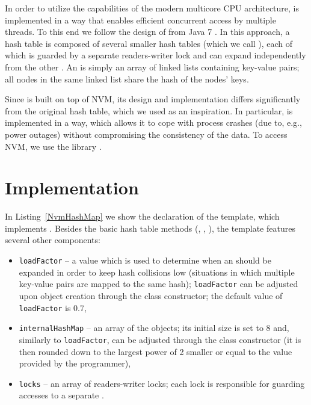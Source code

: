     
    In order to utilize the capabilities of the modern multicore CPU architecture, \PHT is implemented in a way that enables efficient concurrent access by multiple threads. 
    To this end we follow the design of \ConcurrentHashMap from Java 7 \cite{ConcurrentHashMapJava}. 
    In this approach, a hash table is composed of several smaller hash tables (which we call \internalHashMap), each of which is guarded by a separate readers-writer lock and can expand independently from the other \internalHashMaps. 
    An \internalHashMap is simply an array of linked lists containing key-value pairs; all nodes in the same linked list share the hash of the nodes' keys.
    
    Since \PHT is built on top of NVM, its design and implementation differs significantly from the original hash table, which we used as an inspiration. 
    In particular, \PHT is implemented in a way, which allows it to cope with process crashes (due to, e.g., power outages) without compromising the consistency of the data. 
    To access NVM, we use the \libpmemobj library \cite{Libpmemobj}.
    
\section{Implementation}

    In Listing~\ref{NvmHashMap} we show the declaration of the \NvmHashMap template, which implements \PHT. Besides the basic hash table methods (\getMethod, \insertMethod, \removeMethod), the template features several other components:
    \begin{itemize}
        \item \texttt{loadFactor} -- a value which is used to determine when an \internalHashMap should be expanded in order to keep hash collisions low (situations in which multiple key-value pairs are mapped to the same hash); \texttt{loadFactor} can be adjusted upon object creation through the class constructor; the default value of \texttt{loadFactor} is 0.7, 
        \item \texttt{internalHashMap} -- an array of the \internalHashMap objects; its initial size is set to 8 and, similarly to \texttt{loadFactor}, can be adjusted through the class constructor (it is then rounded down to the largest power of 2 smaller or equal to the value provided by the programmer),
        \item \texttt{locks} -- an array of readers-writer locks; each lock is responsible for guarding accesses to a separate \internalHashMap.
    \end{itemize}

